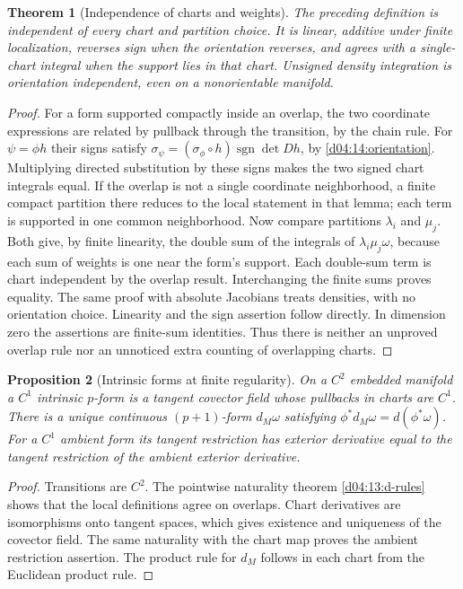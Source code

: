 \documentclass[11pt,oneside,openany]{book}
\newtheorem{theorem}{Theorem}[chapter]
\newtheorem{proposition}[theorem]{Proposition}
\theoremstyle{definition}
\theoremstyle{remark}
\DeclareMathOperator{\sgn}{sgn}
\begin{document}
\begin{theorem}[Independence of charts and weights]\label{d04:15:independence}
The preceding definition is independent of every chart and partition
choice. It is linear, additive under finite localization, reverses sign
when the orientation reverses, and agrees with a single-chart integral
when the support lies in that chart. Unsigned density integration is
orientation independent, even on a nonorientable manifold.
\end{theorem}
\begin{proof}
For a form supported compactly inside an overlap, the two coordinate
expressions are related by pullback through the transition, by the chain
rule. For $\psi=\phi h$ their signs satisfy
$\sigma_\psi=(\sigma_\phi\circ h)\sgn\det Dh$, by
\cref{d04:14:orientation}. Multiplying directed substitution by these signs
makes the two signed chart integrals equal. If the
overlap is not a single coordinate neighborhood, a finite compact partition
there reduces to the local statement in that lemma; each term is supported
in one common neighborhood. Now compare partitions $\lambda_i$ and $\mu_j$.
Both give, by finite linearity, the double sum of the integrals of
$\lambda_i\mu_j\omega$, because each sum of weights is one near the form's
support. Each double-sum term is chart independent by the overlap result.
Interchanging the finite sums proves equality. The same proof with absolute
Jacobians treats densities, with no orientation choice. Linearity and the
sign assertion follow directly. In dimension zero the assertions are
finite-sum identities. Thus there is neither an unproved overlap rule nor
an unnoticed extra counting of overlapping charts.
\end{proof}

\begin{proposition}[Intrinsic forms at finite regularity]\label{d04:15:intrinsic-d}
On a $C^2$ embedded manifold a $C^1$ intrinsic $p$-form is a tangent
covector field whose pullbacks in charts are $C^1$. There is a unique
continuous $(p+1)$-form $d_M\omega$ satisfying
$\phi^*d_M\omega=d(\phi^*\omega)$. For a $C^1$ ambient form its tangent
restriction has exterior derivative equal to the tangent restriction of
the ambient exterior derivative.
\end{proposition}
\begin{proof}
Transitions are $C^2$. The pointwise naturality theorem
\cref{d04:13:d-rules} shows that the local definitions agree on overlaps.
Chart derivatives are isomorphisms onto tangent spaces, which gives
existence and uniqueness of the covector field. The same naturality with
the chart map proves the ambient restriction assertion. The product rule
for $d_M$ follows in each chart from the Euclidean product rule.
\end{proof}
\end{document}
